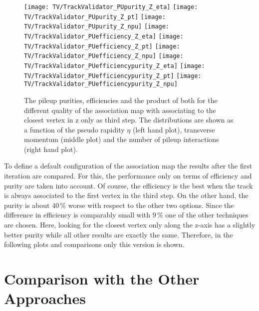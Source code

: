 \newpage{}

\begin{figure}[h!t]
  \centering
  \texttt{[image: TV/TrackValidator\_PUpurity\_Z\_eta]}
  \texttt{[image: TV/TrackValidator\_PUpurity\_Z\_pt]}
  \texttt{[image: TV/TrackValidator\_PUpurity\_Z\_npu]}
  \newline
  \texttt{[image: TV/TrackValidator\_PUefficiency\_Z\_eta]}
  \texttt{[image: TV/TrackValidator\_PUefficiency\_Z\_pt]}
  \texttt{[image: TV/TrackValidator\_PUefficiency\_Z\_npu]}
  \newline
  \texttt{[image: TV/TrackValidator\_PUefficiencypurity\_Z\_eta]}
  \texttt{[image: TV/TrackValidator\_PUefficiencypurity\_Z\_pt]}
  \texttt{[image: TV/TrackValidator\_PUefficiencypurity\_Z\_npu]}
  \caption[Pileup purities, efficiencies and their product for the different quality of the association map with associating to the closest vertex in z only as third step]{The pileup purities, efficiencies and the product of both for the different quality of the association map with associating to the closest vertex in z only as third step. The distributions are shown as a function of the pseudo rapidity $\eta$ (left hand plot), transverse momentum (middle plot) and the number of pileup interactions (right hand plot). \label{plot:TASEFRDQZPileup}}
\end{figure}

To define a default configuration of the association map the results after the first iteration are compared. For this, the performance only on terms of efficiency and purity are taken into account. Of course, the efficiency is the best when the track is always associated to the first vertex in the third step. On the other hand, the purity is about $40\,\%$ worse with respect to the other two options. Since the difference in efficiency is comparably small with $9\,\%$ one of the other techniques are chosen. Here, looking for the closest vertex only along the z-axis has a slightly better purity while all other results are exactly the same. Therefore, in the following plots and comparisons only this version is shown.

\section{Comparison with the Other Approaches \label{sec:TASEFRDA}}

